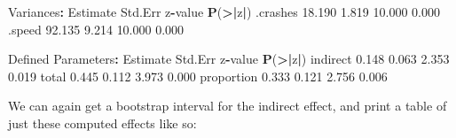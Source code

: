 \documentclass[]{article}
\newenvironment{Shaded}{\begin{snugshade}}{\end{snugshade}}
\newcommand{\DataTypeTok}[1]{\textcolor[rgb]{0.13,0.29,0.53}{#1}}
\newcommand{\DecValTok}[1]{\textcolor[rgb]{0.00,0.00,0.81}{#1}}
\newcommand{\ErrorTok}[1]{\textcolor[rgb]{0.64,0.00,0.00}{\textbf{#1}}}
\newcommand{\FloatTok}[1]{\textcolor[rgb]{0.00,0.00,0.81}{#1}}
\newcommand{\KeywordTok}[1]{\textcolor[rgb]{0.13,0.29,0.53}{\textbf{#1}}}
\newcommand{\NormalTok}[1]{#1}
\newcommand{\OperatorTok}[1]{\textcolor[rgb]{0.81,0.36,0.00}{\textbf{#1}}}
\newcommand{\StringTok}[1]{\textcolor[rgb]{0.31,0.60,0.02}{#1}}
\begin{document}
\begin{Shaded}
\begin{Highlighting}[]
\NormalTok{Variances}\OperatorTok{:}
\StringTok{                   }\NormalTok{Estimate  Std.Err  z}\OperatorTok{-}\NormalTok{value  }\KeywordTok{P}\NormalTok{(}\OperatorTok{>}\ErrorTok{|}\NormalTok{z}\OperatorTok{|}\NormalTok{)}
\NormalTok{   .crashes          }\FloatTok{18.190}    \FloatTok{1.819}   \FloatTok{10.000}    \FloatTok{0.000}
\NormalTok{   .speed            }\FloatTok{92.135}    \FloatTok{9.214}   \FloatTok{10.000}    \FloatTok{0.000}

\NormalTok{Defined Parameters}\OperatorTok{:}
\StringTok{                   }\NormalTok{Estimate  Std.Err  z}\OperatorTok{-}\NormalTok{value  }\KeywordTok{P}\NormalTok{(}\OperatorTok{>}\ErrorTok{|}\NormalTok{z}\OperatorTok{|}\NormalTok{)}
\NormalTok{    indirect          }\FloatTok{0.148}    \FloatTok{0.063}    \FloatTok{2.353}    \FloatTok{0.019}
\NormalTok{    total             }\FloatTok{0.445}    \FloatTok{0.112}    \FloatTok{3.973}    \FloatTok{0.000}
\NormalTok{    proportion        }\FloatTok{0.333}    \FloatTok{0.121}    \FloatTok{2.756}    \FloatTok{0.006}
\end{Highlighting}
\end{Shaded}

We can again get a bootstrap interval for the indirect effect, and print a table
of just these computed effects like so:

\begin{Shaded}
\end{Shaded}
\end{document}
